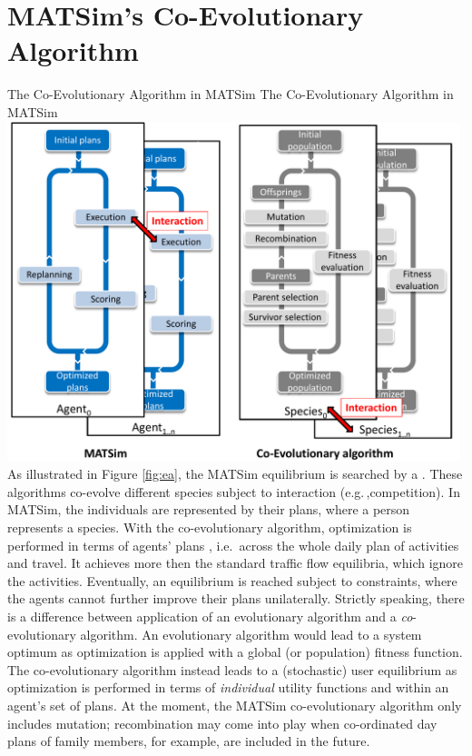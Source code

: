 \section{MATSim's Co-Evolutionary Algorithm}
\label{sec:co-ev}
%
\createfigure%
{The Co-Evolutionary Algorithm in MATSim}%
{The Co-Evolutionary Algorithm in MATSim   }%
{\label{fig:ea}}%
{\includegraphics[width=0.99\textwidth, angle=0]{using/figures/MATSimVSea.pdf}}%
{}
%
As illustrated in Figure \ref{fig:ea}, the MATSim equilibrium is searched by a \emph{} \citep[see e.g.\,,][]{PopoviciEtAl_2012}. These algorithms co-evolve different species subject to interaction (e.g.\,,competition). In MATSim, the individuals are represented by their plans, where a person represents a species. With the co-evolutionary algorithm, optimization is performed in terms of agents' plans , i.e.\ across the whole daily plan of activities and travel. It achieves more then the standard traffic flow equilibria, which ignore the activities. Eventually, an equilibrium is reached subject to constraints, where the agents cannot further improve their plans unilaterally. Strictly speaking, there is a difference between application of an evolutionary algorithm and a \emph{co}-evolutionary algorithm. An evolutionary algorithm would lead to a system optimum as optimization is applied with a global (or population) fitness function. The co-evolutionary algorithm instead leads to a (stochastic) user equilibrium as optimization is performed in terms of \emph{individual} utility functions and within an agent's set of plans. At the moment, the MATSim co-evolutionary algorithm only includes mutation; recombination may come into play when co-ordinated day plans of family members, for example, are included in the future.


